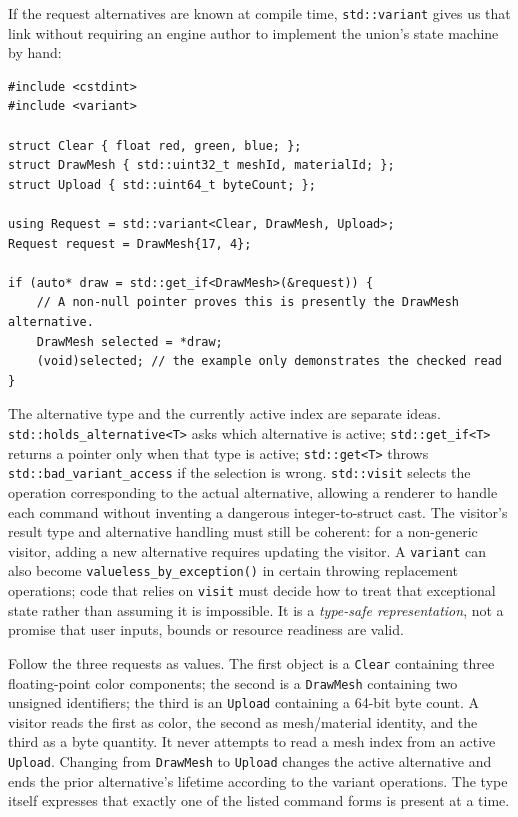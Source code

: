 If the request alternatives are known at compile time, \texttt{std::variant} gives us that link without requiring an engine author to implement the union's state machine by hand:

\begin{verbatim}
#include <cstdint>
#include <variant>

struct Clear { float red, green, blue; };
struct DrawMesh { std::uint32_t meshId, materialId; };
struct Upload { std::uint64_t byteCount; };

using Request = std::variant<Clear, DrawMesh, Upload>;
Request request = DrawMesh{17, 4};

if (auto* draw = std::get_if<DrawMesh>(&request)) {
    // A non-null pointer proves this is presently the DrawMesh alternative.
    DrawMesh selected = *draw;
    (void)selected; // the example only demonstrates the checked read
}
\end{verbatim}

The alternative type and the currently active index are separate ideas. \texttt{std::holds\_alternative\textless{}T\textgreater{}} asks which alternative is active; \texttt{std::get\_if\textless{}T\textgreater{}} returns a pointer only when that type is active; \texttt{std::get\textless{}T\textgreater{}} throws \texttt{std::bad\_variant\_access} if the selection is wrong. \texttt{std::visit} selects the operation corresponding to the actual alternative, allowing a renderer to handle each command without inventing a dangerous integer-to-struct cast. The visitor's result type and alternative handling must still be coherent: for a non-generic visitor, adding a new alternative requires updating the visitor. A \texttt{variant} can also become \texttt{valueless\_by\_exception()} in certain throwing replacement operations; code that relies on \texttt{visit} must decide how to treat that exceptional state rather than assuming it is impossible. It is a \emph{type-safe representation}, not a promise that user inputs, bounds or resource readiness are valid.

Follow the three requests as values. The first object is a \texttt{Clear} containing three floating-point color components; the second is a \texttt{DrawMesh} containing two unsigned identifiers; the third is an \texttt{Upload} containing a 64-bit byte count. A visitor reads the first as color, the second as mesh/material identity, and the third as a byte quantity. It never attempts to read a mesh index from an active \texttt{Upload}. Changing from \texttt{DrawMesh} to \texttt{Upload} changes the active alternative and ends the prior alternative's lifetime according to the variant operations. The type itself expresses that exactly one of the listed command forms is present at a time.

